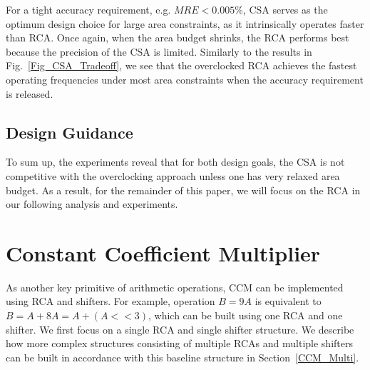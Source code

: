 \documentclass[prodmode,acmtrets]{acmsmall} %
\begin{document}
For a tight accuracy requirement, e.g. $MRE<0.005\%$, CSA serves as the optimum design choice for large area constraints, as it intrinsically operates faster than RCA. Once again, when the area budget shrinks, the RCA performs best because the precision of the CSA is limited. Similarly to the results in Fig.~\ref{Fig_CSA_Tradeoff}, we see that the overclocked RCA achieves the fastest operating frequencies under most area constraints when the accuracy requirement is released.

\subsection{Design Guidance}
To sum up, the experiments reveal that for both design goals, the CSA is not competitive with the overclocking approach unless one has very relaxed area budget. As a result, for the remainder of this paper, we will focus on the RCA in our following analysis and experiments.


\section{Constant Coefficient Multiplier}\label{section_CCM}

As another key primitive of arithmetic operations, CCM can be implemented using RCA and shifters. For example, operation $B=9A$ is equivalent to $B=A+8A=A+(A<<3)$, which can be built using one RCA and one shifter. We first focus on a single RCA and single shifter structure. We describe how more complex structures consisting of multiple RCAs and multiple shifters can be built in accordance with this baseline structure in Section~\ref{CCM_Multi}.
\end{document}
